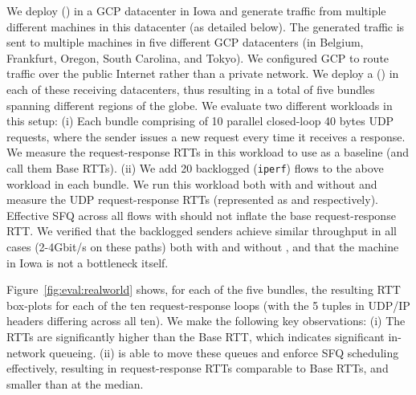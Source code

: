 We deploy \name (\inbox) in a GCP datacenter in Iowa and generate traffic from multiple different machines in this datacenter (as detailed below). 
The generated traffic is sent to multiple machines in five different GCP datacenters (in Belgium, Frankfurt, Oregon, South Carolina, and Tokyo). We configured GCP to route traffic over the public Internet rather than a private network. 
We deploy a \name (\outbox) in each of these receiving datacenters, thus resulting in a total of five bundles spanning different regions of the globe.
We evaluate two different workloads in this setup: (i) Each bundle comprising of 10 parallel closed-loop 40 bytes UDP requests, where the sender issues a new request every time it receives a response. We measure the request-response RTTs in this workload to use as a baseline (and call them Base RTTs). (ii) We add 20 backlogged (\texttt{iperf}) flows to the above workload in each bundle. We run this workload both with and without \name and measure the UDP request-response RTTs (represented as \name and \baseline respectively). Effective SFQ across all flows with \name should not inflate the base request-response RTT.
We verified that the backlogged senders achieve similar throughput in all cases (2-4Gbit/s on these paths) both with and without \name, and that the \name machine in Iowa is not a bottleneck itself. 

Figure~\ref{fig:eval:realworld} shows, for each of the five bundles, the resulting RTT box-plots for each of the ten request-response loops (with the 5 tuples in UDP/IP headers differing across all ten). 
We make the following key observations: (i) The \baseline RTTs are significantly higher than the Base RTT, which indicates significant in-network queueing. (ii) \name is able to move these queues and enforce SFQ scheduling effectively, resulting in request-response RTTs comparable to Base RTTs, and \realworldMedianLatencyImprovement smaller than \baseline at the median.

